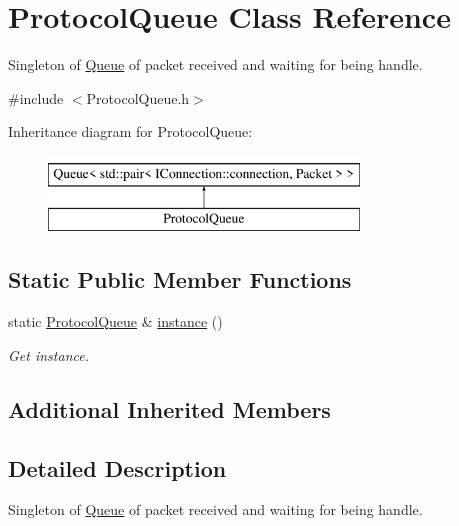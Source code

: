 \hypertarget{class_protocol_queue}{\section{Protocol\-Queue Class Reference}
\label{class_protocol_queue}
}


Singleton of \hyperlink{class_queue}{Queue} of packet received and waiting for being handle.  




{\ttfamily \#include $<$Protocol\-Queue.\-h$>$}

Inheritance diagram for Protocol\-Queue\-:\begin{figure}[H]
\begin{center}
\leavevmode
\includegraphics[height=2.000000cm]{class_protocol_queue}
\end{center}
\end{figure}
\subsection*{Static Public Member Functions}
\begin{DoxyCompactItemize}
\item 
static \hyperlink{class_protocol_queue}{Protocol\-Queue} \& \hyperlink{class_protocol_queue_a8e20899bbb7308e6eafca359390b17b1}{instance} ()
\begin{DoxyCompactList}\small\item\em Get instance. \end{DoxyCompactList}\end{DoxyCompactItemize}
\subsection*{Additional Inherited Members}


\subsection{Detailed Description}
Singleton of \hyperlink{class_queue}{Queue} of packet received and waiting for being handle. 

